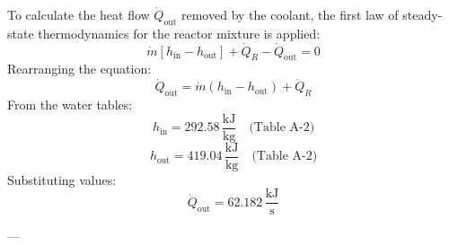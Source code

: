 To calculate the heat flow \( \dot{Q}_{\text{out}} \) removed by the coolant, the first law of steady-state thermodynamics for the reactor mixture is applied:  
\[
\dot{m} \left[ h_{\text{in}} - h_{\text{out}} \right] + \dot{Q}_R - \dot{Q}_{\text{out}} = 0
\]  
Rearranging the equation:  
\[
\dot{Q}_{\text{out}} = \dot{m} \left( h_{\text{in}} - h_{\text{out}} \right) + \dot{Q}_R
\]  
From the water tables:  
\[
h_{\text{in}} = 292.58 \, \frac{\text{kJ}}{\text{kg}} \quad \text{(Table A-2)}
\]  
\[
h_{\text{out}} = 419.04 \, \frac{\text{kJ}}{\text{kg}} \quad \text{(Table A-2)}
\]  
Substituting values:  
\[
\dot{Q}_{\text{out}} = 62.182 \, \frac{\text{kJ}}{\text{s}}
\]  

---